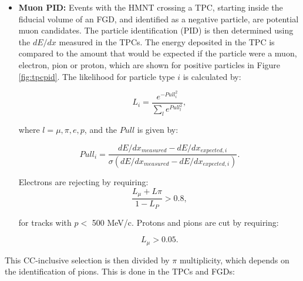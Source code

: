 \begin{itemize}
\item \textbf{Muon PID:} Events with the HMNT crossing a TPC, starting inside the fiducial volume of an FGD, and identified as a negative particle, are potential muon candidates. The particle identification (PID) is then determined using the $dE/dx$ measured in the TPCs. The energy deposited in the TPC is compared to the amount that would be expected if the particle were a muon, electron, pion or proton, which are shown for positive particles in Figure \ref{fig:tpcpid}. The likelihood for particle type $i$ is calculated by:

\begin{equation}
L_{i} = \frac{e^{-Pull_{i}^{2}}}{\sum_{l}e^{Pull_{l}^2}},
\end{equation}

where $l = \mu, \pi, e, p$, and the $Pull$ is given by:

\begin{equation}
Pull_{i} = \frac{dE/dx_{measured} - dE/dx_{expected,i}}{\sigma(dE/dx_{measured}-dE/dx_{expected,i})}.
\end{equation}

Electrons are rejecting by requiring:
\begin{equation}
\frac{L_{\mu}+L{\pi}}{1-L_P} > 0.8,
\end{equation}

for tracks with $p < $ 500 MeV/c. Protons and pions are cut by requiring:

\begin{equation}
L_{\mu} > 0.05.
\end{equation}
\end{itemize}

This CC-inclusive selection is then divided by $\pi$ multiplicity, which depends on the identification of pions. This is done in the TPCs and FGDs:

